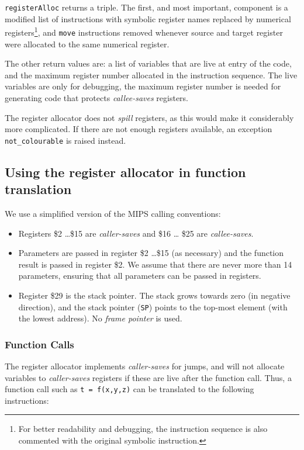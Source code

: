 \documentclass[11pt,a4paper]{article}
\newcommand{\codesize}{\scriptsize}
\newcommand{\cd}[1]{{{\codesize\tt #1}}}
\begin{document}
{\tt registerAlloc} returns a triple. The first, and most important, component 
is a modified list of instructions with symbolic register names replaced by 
numerical registers\footnote{For better readability and debugging, the instruction 
	sequence is also commented with the original symbolic instruction.}, and 
\cd{move} instructions removed whenever source and target register were allocated
to the same numerical register.

The other return values are: a list of variables that are live at entry of the code,
and the maximum register number allocated in the instruction sequence.
The live variables are only for debugging, the maximum register number
is needed for generating code that protects \emph{callee-saves} registers.

The register allocator does not \emph{spill} registers, as this would make it
considerably more complicated. If there are not enough registers available,
an exception \texttt{not\_colourable} is raised instead.

\subsection{Using the register allocator in function translation}

We use a simplified version of the MIPS calling conventions:

\begin{itemize}

\item Registers \$2 \ldots \$15 are {\em caller-saves} and \$16 \ldots
  \$25 are {\em callee-saves}.

\item Parameters are passed in register \$2 \ldots \$15 (as necessary)
	and the function result is passed in register \$2.
	We assume that there are never more than 14 parameters, ensuring that
	all parameters can be passed in registers.

\item Register \$29 is the stack pointer. The stack grows towards zero 
	(in negative direction), and the stack pointer (\cd{SP}) points to
	the top-most element (with the lowest address).
	No \emph{frame pointer} is used.

\end{itemize}

\subsubsection{Function Calls}
The register allocator implements \emph{caller-saves} for jumps, 
and will not allocate variables to \emph{caller-saves} registers if
these are live after the function call. Thus, a function call such as
\texttt{t = f(x,y,z)} can be translated to the following instructions:
\end{document}
